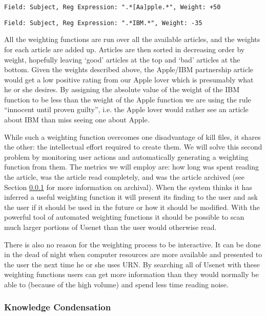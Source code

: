 {\tt Field: Subject, Reg Expression: ".*[Aa]pple.*", Weight: +50}

{\tt Field: Subject, Reg Expression: ".*IBM.*", Weight: -35}

All the weighting functions are run over all the available articles, and the
weights for each article are added up. Articles are then sorted in
decreasing order by weight, hopefully leaving `good' articles at the top and
`bad' articles at the bottom.
Given the weights described above, the Apple/IBM partnership article would
get a low positive rating from our Apple lover which is presumably what he
or she desires. By assigning the absolute value of the weight of the IBM
function to be less than the weight of the Apple function we are using the
rule ``innocent until proven guilty'', i.e. the Apple lover would rather see
an article about IBM than miss seeing one about Apple.

While such a weighting function overcomes one disadvantage of kill files, it
shares the other: the intellectual effort required to create them. We will
solve this second problem by monitoring user actions and automatically
generating a weighting function from them. The metrics we will employ are: how
long was spent reading the article, was the article read completely, and was
the article archived (see Section \ref{archival} for more information on
archival). When the system thinks it has inferred a useful weighting
function it will present its finding to the user and ask the user if it
should be used in the future or how it should be modified. With the powerful
tool of automated weighting functions it should be possible to scan much
larger portions of Usenet than the user would otherwise read.

There is also no reason for the weighting process to be interactive. It can
be done in the dead of night when computer resources are more available and
presented to the user the next time he or she uses URN. By searching all of
Usenet with these weighting functions users can get more information than
they would normally be able to (because of the high volume) and spend less
time reading noise.

\subsubsection{Knowledge Condensation}
\label{archival}

